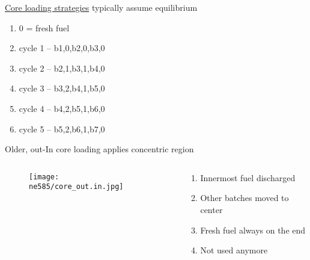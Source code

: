 \documentclass[aspectratio=1610,pdftex,dvipsnames,compress,xcolor={dvipsnames}]{beamer}
\begin{document}
\begin{frame}{\href{http://www.iaea.org/inis/collection/NCLCollectionStore/_Public/27/002/27002175.pdf}{Core loading strategies} typically assume equilibrium}
    \begin{enumerate}[topsep=0pt,itemsep=15pt,leftmargin=*,label=(\arabic*)]
        \item[]0 = fresh fuel
        \item[]cycle 1 -- b{1,0},b{2,0},b{3,0}
        \item[]cycle 2 -- b{2,1},b{3,1},b{4,0}
        \item[]cycle 3 -- b{3,2},b{4,1},b{5,0}
        \item[]cycle 4 -- b{4,2},b{5,1},b{6,0}
        \item[]cycle 5 -- b{5,2},b{6,1},b{7,0}
    \end{enumerate}
\end{frame}


\begin{frame}{Older, out-In core loading applies concentric region}
    \begin{columns}

        \begin{column}{0.55\textwidth}
            \begin{figure}
                \centering
                \texttt{[image: ne585/core\_out.in.jpg]}
            \end{figure}
        \end{column}

        \begin{column}{0.45\textwidth}
            \begin{enumerate}[series=outerlist,topsep=0pt,itemsep=15pt,leftmargin=*,label=(\arabic*)]
                \item[]Innermost fuel discharged
                \item[]Other batches moved to center
                \item[]Fresh fuel always on the end
                \item[]Not used anymore
            \end{enumerate}
        \end{column}

    \end{columns}
\end{frame}
\end{document}
